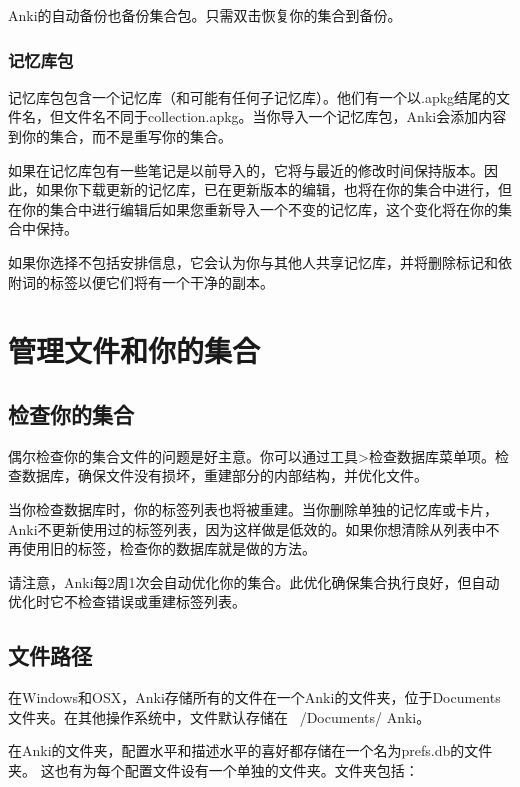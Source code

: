\documentclass[a4paper]{book}
\begin{document}
		\begin{shaded}
			Anki的自动备份也备份集合包。只需双击恢复你的集合到备份。
		\end{shaded}
		
		
		\subsection{记忆库包}
		记忆库包包含一个记忆库（和可能有任何子记忆库）。他们有一个以.apkg结尾的文件名，但文件名不同于collection.apkg。当你导入一个记忆库包，Anki会添加内容到你的集合，而不是重写你的集合。
		
		如果在记忆库包有一些笔记是以前导入的，它将与最近的修改时间保持版本。因此，如果你下载更新的记忆库，已在更新版本的编辑，也将在你的集合中进行，但在你的集合中进行编辑后如果您重新导入一个不变的记忆库，这个变化将在你的集合中保持。
		
		如果你选择不包括安排信息，它会认为你与其他人共享记忆库，并将删除标记和依附词的标签以便它们将有一个干净的副本。
		
		\chapter{管理文件和你的集合}\label{}
		
		\section{检查你的集合}
		偶尔检查你的集合文件的问题是好主意。你可以通过工具>检查数据库菜单项。检查数据库，确保文件没有损坏，重建部分的内部结构，并优化文件。
		
		当你检查数据库时，你的标签列表也将被重建。当你删除单独的记忆库或卡片，Anki不更新使用过的标签列表，因为这样做是低效的。如果你想清除从列表中不再使用旧的标签，检查你的数据库就是做的方法。
		
		请注意，Anki每2周1次会自动优化你的集合。此优化确保集合执行良好，但自动优化时它不检查错误或重建标签列表。
		
		\section{文件路径}
		
		在Windows和OSX，Anki存储所有的文件在一个Anki的文件夹，位于Documents文件夹。在其他操作系统中，文件默认存储在~ /Documents/ Anki。
		
		在Anki的文件夹，配置水平和描述水平的喜好都存储在一个名为prefs.db的文件夹。
		这也有为每个配置文件设有一个单独的文件夹。文件夹包括：
		
\end{document}

